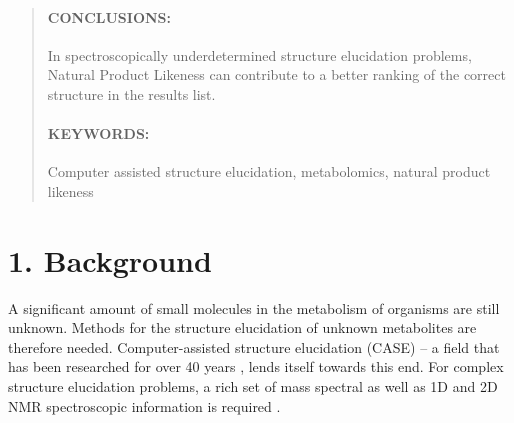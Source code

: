 \documentclass[10pt]{bmc_article}
\newenvironment{bmcformat}{\begin{raggedright}\baselineskip20pt\sloppy\setboolean{publ}{false}}{\end{raggedright}\baselineskip20pt\sloppy}
\begin{document}
\begin{bmcformat}
\begin{abstract}
        \paragraph*{CONCLUSIONS:} In spectroscopically underdetermined structure elucidation problems, Natural Product Likeness can contribute to a better ranking of the correct structure in the results list.  
      
         \paragraph*{KEYWORDS:} Computer assisted structure elucidation, metabolomics, natural product likeness 
        \end{abstract}










\section*{1. Background}

A significant amount of small molecules in the metabolism of organisms are still unknown. Methods for the structure elucidation of unknown metabolites are therefore needed. Computer-assisted structure elucidation (CASE) -- a field that has been researched for over 40 years \cite{Steinbeck:2001}, lends itself towards this end. For complex structure elucidation problems, a rich set of mass spectral as well as 1D and 2D NMR spectroscopic information is required \cite{steinbeck2003}. 


\end{bmcformat}
\end{document}
